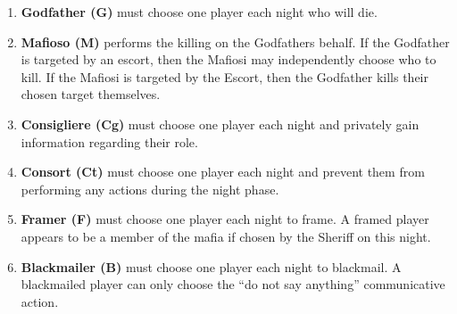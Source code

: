 \begin{enumerate}
	\item\textbf{Godfather (G)} must choose one player each night who will die.
	\item\textbf{Mafioso (M)} performs the killing on the Godfathers behalf. If
	      the
	      Godfather is targeted by an escort, then the Mafiosi may independently
	      choose who to kill. If the Mafiosi is targeted by the Escort, then the
	      Godfather kills their chosen target themselves.
	\item\textbf{Consigliere (Cg)} must choose one player each night and
	      privately
	      gain information regarding their role.
	\item\textbf{Consort (Ct)} must choose one player each night and prevent
	      them
	      from performing any actions during the night phase.
	\item\textbf{Framer (F)} must choose one player each night to frame. A
	      framed
	      player appears to be a member of the mafia if chosen by the Sheriff on this
	      night.
	\item\textbf{Blackmailer (B)} must choose one player each night to
	      blackmail. A
	      blackmailed player can only choose the “do not say anything” communicative
	      action.
\end{enumerate}
\label{app:roles}